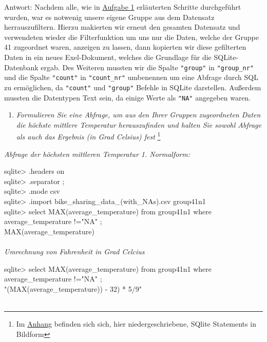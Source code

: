 \documentclass{article}
\begin{document}
    


\noindent Antwort: Nachdem alle, wie in \hyperlink{Aufgabe 1}{Aufgabe 1} erläuterten Schritte durchgeführt wurden, war es notwenig unsere eigene Gruppe aus dem Datensatz herrauszufiltern. Hierzu makierten wir erneut den gesamten Datensatz und verwendeten wieder die Filterfunktion um uns nur die Daten, welche der Gruppe 41 zugeordnet waren, anzeigen zu lassen, dann kopierten wir diese gefilterten Daten in ein neues Exel-Dokument, welches die Grundlage für die SQLite-Datenbank ergab. Des Weiteren mussten wir die Spalte \texttt{"group"} in \texttt{"group\_nr"} und die Spalte  \texttt{"count"} in  \texttt{"count\_nr"} umbenennen um eine Abfrage durch SQL zu ermöglichen, da \texttt{"count"} und \texttt{"group"} Befehle in SQLite darstellen. Außerdem mussten die Datentypen Text sein, da einige Werte als \texttt{"NA"} angegeben waren.    

\newpage
    
\begin{enumerate}[resume]
    \item \textit{Formulieren Sie eine Abfrage, um aus den Ihrer Gruppen zugeordneten Daten die höchste mittlere Temperatur herauszufinden und halten Sie sowohl Abfrage als auch das Ergebnis (in Grad Celsius) fest} \footnote{Im \hyperlink{anhang}{Anhang} befinden sich sich, hier niedergeschriebene, SQlite Statements in Bildform} 
    \end{enumerate}
\indent



\textit{Abfrage der höchsten mittleren Temperatur 1. Normalform:}


sqlite> .headers on \\ \indent
sqlite> .separator ; \\ \indent
sqlite> .mode csv \\ \indent
sqlite> .import bike\_sharing\_data\_(with\_NAs).csv group41n1 \\ \indent
sqlite> select MAX(average\_temperature) from group41n1 where \\ \indent 
\hspace{1.1cm} average\_temperature !="NA" ; \\ \indent
MAX(average\_temperature) \\  \\ 


\textit{Umrechnung von Fahrenheit in Grad Celcius} 


sqlite> select MAX(average\_temperature) from group41n1 where \\ \indent 
\hspace{1.1cm} average\_temperature !="NA" ; \\ \indent
"(MAX(average\_temperature)) - 32) * 5/9" \\  \\ \indent
\end{document}
